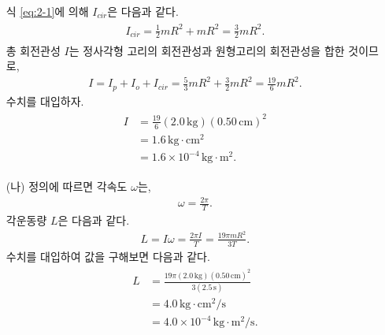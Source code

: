 \documentclass[floatfix,nofootinbib,superscriptaddress,fleqn]{revtex4-2}
\begin{document}
\begin{itemize}
\begin{align}
  \end{align}
  식 \eqref{eq:2-1}에 의해 $I_{cir}$은 다음과 같다.
  \begin{align}
    \begin{split}
      I_{cir} = \frac{1}{2}mR^2+mR^2 = \frac{3}{2}mR^2.
    \end{split}
  \end{align}
  총 회전관성 $I$는 정사각형 고리의 회전관성과 원형고리의 회전관성을 합한 것이므로,
  \begin{align}
    I = I_p+I_o+I_{cir} = \frac{5}{3}mR^2+\frac{3}{2}mR^2=\frac{19}{6}mR^2.
  \end{align}
  수치를 대입하자.
  \begin{align}
    \begin{split}
      I&=\frac{19}{6}(2.0\,\mathrm{kg})(0.50\,\mathrm{cm})^2  \\
      &= 1.6\,\mathrm{kg\cdot cm^2} \\
      &= 1.6\times 10^{-4}\,\mathrm{kg\cdot m^2} .
    \end{split}
  \end{align}
  \item[(나)] 
  정의에 따르면 각속도 $\omega$는,
  \begin{align}
    \omega = \frac{2\pi}{T}.
  \end{align}
  각운동량 $L$은 다음과 같다.
  \begin{align}
    L = I\omega = \frac{2\pi I}{T} = \frac{19\pi mR^2}{3T}.
  \end{align}
  수치를 대입하여 값을 구해보면 다음과 같다.
  \begin{align}
    \begin{split}
      L &=\frac{19\pi (2.0\,\mathrm{kg})(0.50\,\mathrm{cm})^2}
      {3(2.5\,\mathrm{s})}  \\
      &= 4.0\,\mathrm{kg\cdot cm^2/s} \\
      &= 4.0\times 10^{-4}\,\mathrm{kg\cdot m^2/s}.
    \end{split}
  \end{align}
  \end{itemize}

\vspace{1.cm}
\end{document}
